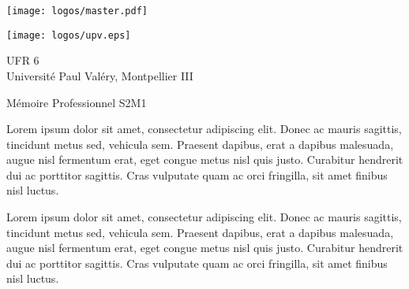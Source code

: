 \begin{minipage}{.4\textwidth}
\begin{center}
\texttt{[image: logos/master.pdf]}
\end{center}
\end{minipage}%
\hspace{2cm}
\begin{minipage}{.4\textwidth}
\begin{center}
\texttt{[image: logos/upv.eps]}
\end{center}
\end{minipage}%


\begin{center}
\vspace{1cm}
{\huge UFR 6}\\
Université Paul Valéry, Montpellier III\\
\vspace{1cm}

{\Large Mémoire Professionnel S2M1}
\end{center}
\noindent\makebox[\linewidth]{\rule{\paperwidth}{0.4pt}}
\vspace{-15em}
{\let\newpage\relax\maketitle}
\vspace{-10em}
\noindent\makebox[\linewidth]{\rule{\paperwidth}{0.4pt}}

\begin{minipage}{.45\textwidth}
\vspace{3em}
Lorem ipsum dolor sit amet, consectetur adipiscing elit. Donec ac mauris sagittis, tincidunt metus sed, vehicula sem. Praesent dapibus, erat a dapibus malesuada, augue nisl fermentum erat, eget congue metus nisl quis justo. Curabitur hendrerit dui ac porttitor sagittis. Cras vulputate quam ac orci fringilla, sit amet finibus nisl luctus.

\end{minipage}%
\hspace{0.5cm}
\begin{minipage}{.45\textwidth}
\vspace{3em}
Lorem ipsum dolor sit amet, consectetur adipiscing elit. Donec ac mauris sagittis, tincidunt metus sed, vehicula sem. Praesent dapibus, erat a dapibus malesuada, augue nisl fermentum erat, eget congue metus nisl quis justo. Curabitur hendrerit dui ac porttitor sagittis. Cras vulputate quam ac orci fringilla, sit amet finibus nisl luctus.
  
\end{minipage}
\newpage